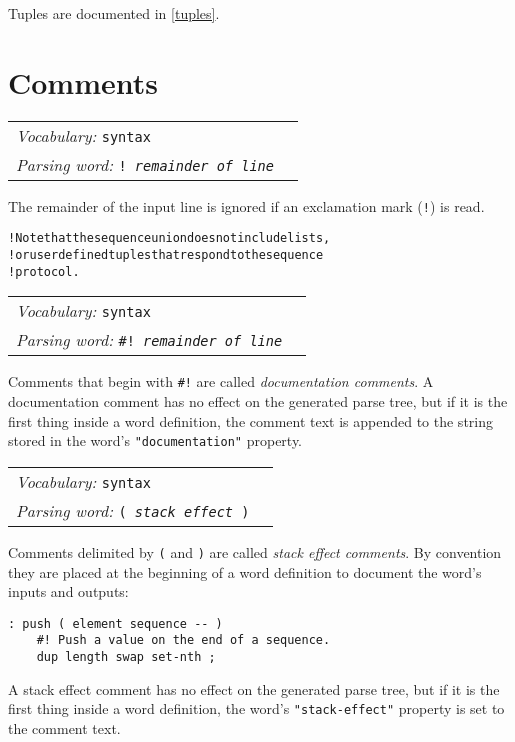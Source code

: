 \documentclass{book}
\newcommand{\vocabulary}[1]{\emph{Vocabulary:} \texttt{#1}&\\}
\newcommand{\parsingword}[2]{\index{\texttt{#1}}\emph{Parsing word:} \texttt{#2}&\\}
\newcommand{\wordtable}[1]{


\begin{tabularx}{12cm}{lX}
\hline
#1
\hline
\end{tabularx}

}
\begin{document}
Tuples are documented in \ref{tuples}.

\section{Comments}\label{comments}

\wordtable{
\vocabulary{syntax}
\parsingword{!}{!~\emph{remainder of line}}
}
The remainder of the input line is ignored if an exclamation mark (\texttt{!}) is read.
\begin{alltt}
! Note that the sequence union does not include lists,
! or user defined tuples that respond to the sequence
! protocol.
\end{alltt}
\wordtable{
\vocabulary{syntax}
\parsingword{hash!}{\#!~\emph{remainder of line}}
}
\newcommand{\doccommentglos}{}
\doccommentglos
Comments that begin with \texttt{\#!} are called \emph{documentation comments}.
A documentation comment has no effect on the generated parse tree, but if it is the first thing inside a word definition, the comment text is appended to the string stored in the word's \texttt{"documentation"} property. 
\wordtable{
\vocabulary{syntax}
\parsingword{(}{( \emph{stack effect} )}
}
\newcommand{\stackcommentglos}{}
\stackcommentglos
Comments delimited by \texttt{(} and \texttt{)} are called \emph{stack effect comments}. By convention they are placed at the beginning of a word definition to document the word's inputs and outputs:
\begin{verbatim}
: push ( element sequence -- )
    #! Push a value on the end of a sequence.
    dup length swap set-nth ;
\end{verbatim}
A stack effect comment has no effect on the generated parse tree, but if it is the first thing inside a word definition, the word's \texttt{"stack-effect"} property is set to the comment text.
\end{document}
